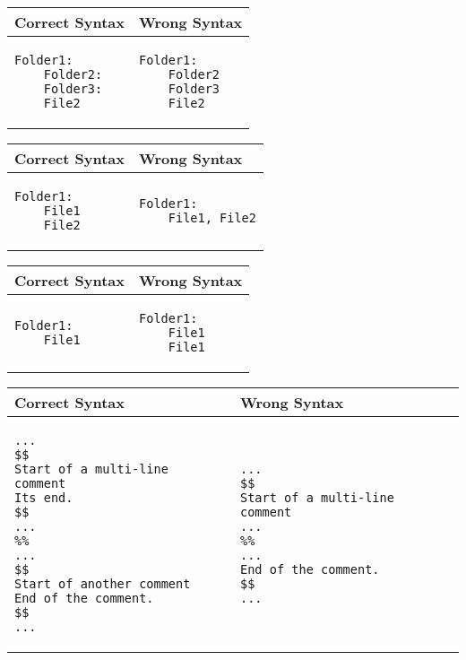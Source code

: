 \documentclass{article}
\begin{document}
\begin{table}[h]
\centering
\begin{tabular}{|p{}|p{}|}
\hline
\textbf{Correct Syntax} & \textbf{Wrong Syntax} \\
\hline
\begin{verbatim}
Folder1:
    Folder2:
    Folder3:
    File2
\end{verbatim}
&
\begin{verbatim}
Folder1:
    Folder2
    Folder3
    File2
\end{verbatim}
\\
\hline
\end{tabular}
\end{table}

\begin{table}[h]
\centering
\begin{tabular}{|p{}|p{}|}
\hline
\textbf{Correct Syntax} & \textbf{Wrong Syntax} \\
\hline
\begin{verbatim}
Folder1:
    File1
    File2
\end{verbatim}
&
\begin{verbatim}
Folder1:
    File1, File2
\end{verbatim}
\\
\hline
\end{tabular}
\end{table}

\begin{table}[h]
\centering
\begin{tabular}{|p{}|p{}|}
\hline
\textbf{Correct Syntax} & \textbf{Wrong Syntax} \\
\hline
\begin{verbatim}
Folder1:
    File1
\end{verbatim}
&
\begin{verbatim}
Folder1:
    File1
    File1
\end{verbatim}
\\
\hline
\end{tabular}
\end{table}

\begin{table}[h]
\centering
\begin{tabular}{|p{}|p{}|}
\hline
\textbf{Correct Syntax} & \textbf{Wrong Syntax} \\
\hline
\begin{verbatim}
...
$$
Start of a multi-line comment
Its end.
$$
...
%%
...
$$
Start of another comment
End of the comment.
$$
...
\end{verbatim}
&
\begin{verbatim}
...
$$
Start of a multi-line comment
...
%%
...
End of the comment.
$$
...
\end{verbatim}
\\
\hline
\end{tabular}
\end{table}
\end{document}
